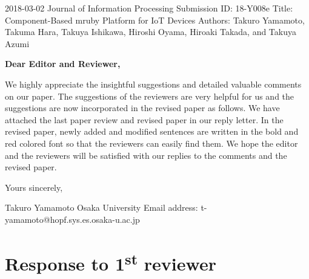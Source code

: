 \documentclass{article}
\newcommand\st{\textsuperscript{st}\xspace}
\begin{document}
\begin{flushleft}
  2018-03-02\newline 
  Journal of Information Processing\newline
  Submission ID: 18-Y008e\newline
  Title: Component-Based mruby Platform for IoT Devices\newline
  Authors: Takuro Yamamoto, Takuma Hara, Takuya Ishikawa, Hiroshi Oyama, Hiroaki Takada, and Takuya Azumi\newline
\end{flushleft}

\textbf{Dear Editor and Reviewer,}\newline

We highly appreciate the insightful suggestions and detailed valuable comments on our paper.
The suggestions of the reviewers are very helpful for us and the suggestions are now incorporated in the revised paper as follows.
We have attached the last paper review and revised paper in our reply letter.
In the revised paper, newly added and modified sentences are written in the bold and red colored font so that the reviewers can easily find them.
We hope the editor and the reviewers will be satisfied with our replies to the comments and the revised paper.
\newline\newline

\begin{flushleft}
  Yours sincerely,\newline

  Takuro Yamamoto\newline
  Osaka University\newline
  Email address: t-yamamoto@hopf.sys.es.osaka-u.ac.jp\newline
\end{flushleft}

\clearpage

\section{Response to 1\st reviewer}
\end{document}
